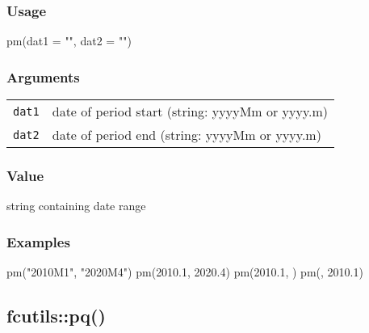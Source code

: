 \documentclass[
  letterpaper,
  DIV=11,
  numbers=noendperiod]{scrreport}
\newenvironment{Shaded}{\begin{snugshade}}{\end{snugshade}}
\newcommand{\AttributeTok}[1]{\textcolor[rgb]{0.40,0.45,0.13}{#1}}
\newcommand{\FloatTok}[1]{\textcolor[rgb]{0.68,0.00,0.00}{#1}}
\newcommand{\FunctionTok}[1]{\textcolor[rgb]{0.28,0.35,0.67}{#1}}
\newcommand{\NormalTok}[1]{\textcolor[rgb]{0.00,0.23,0.31}{#1}}
\newcommand{\StringTok}[1]{\textcolor[rgb]{0.13,0.47,0.30}{#1}}
\begin{document}
\subsubsection{Usage}\label{usage-20}

\begin{Shaded}
\begin{Highlighting}[]
\FunctionTok{pm}\NormalTok{(}\AttributeTok{dat1 =} \StringTok{""}\NormalTok{, }\AttributeTok{dat2 =} \StringTok{""}\NormalTok{)}
\end{Highlighting}
\end{Shaded}

\subsubsection{Arguments}\label{arguments-20}

\begin{longtable}[]{@{}ll@{}}
\toprule\noalign{}
\endhead
\bottomrule\noalign{}
\endlastfoot
\texttt{dat1} & date of period start (string: yyyyMm or yyyy.m) \\
\texttt{dat2} & date of period end (string: yyyyMm or yyyy.m) \\
\end{longtable}

\subsubsection{Value}\label{value-20}

string containing date range

\subsubsection{Examples}\label{examples-20}

\begin{Shaded}
\begin{Highlighting}[]
\FunctionTok{pm}\NormalTok{(}\StringTok{"2010M1"}\NormalTok{, }\StringTok{"2020M4"}\NormalTok{)}
\FunctionTok{pm}\NormalTok{(}\FloatTok{2010.1}\NormalTok{, }\FloatTok{2020.4}\NormalTok{)}
\FunctionTok{pm}\NormalTok{(}\FloatTok{2010.1}\NormalTok{, )}
\FunctionTok{pm}\NormalTok{(, }\FloatTok{2010.1}\NormalTok{)}
\end{Highlighting}
\end{Shaded}

\subsection{fcutils::pq()}\label{fcutilspq}
\end{document}
